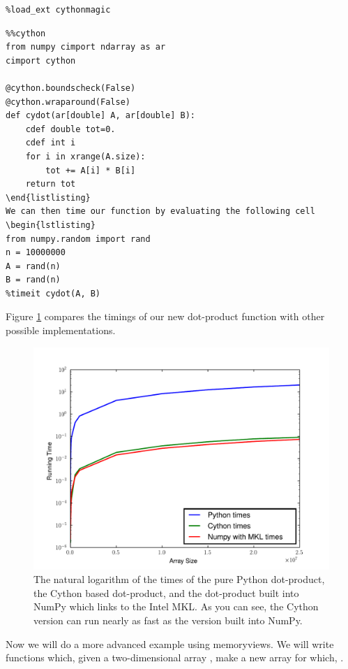 \begin{lstlisting}
%load_ext cythonmagic
\end{lstlisting}

\begin{lstlisting}
%%cython
from numpy cimport ndarray as ar
cimport cython

@cython.boundscheck(False)
@cython.wraparound(False)
def cydot(ar[double] A, ar[double] B):
    cdef double tot=0.
    cdef int i
    for i in xrange(A.size):
        tot += A[i] * B[i]
    return tot
\end{listlisting}
We can then time our function by evaluating the following cell
\begin{lstlisting}
from numpy.random import rand
n = 10000000
A = rand(n)
B = rand(n)
%timeit cydot(A, B)
\end{lstlisting}

Figure \ref{cython:dot} compares the timings of our new dot-product function with other possible implementations.

\begin{figure}
\centering
\includegraphics[width=\textwidth]{dot.pdf}
\caption{
The natural logarithm of the times of the pure Python dot-product, the Cython based dot-product, and the dot-product built into NumPy which links to the Intel MKL.
As you can see, the Cython version can run nearly as fast as the version built into NumPy.
}
\label{cython:dot}
\end{figure}

Now we will do a more advanced example using memoryviews.
We will write functions which, given a two-dimensional array , make a new array  for which, .

